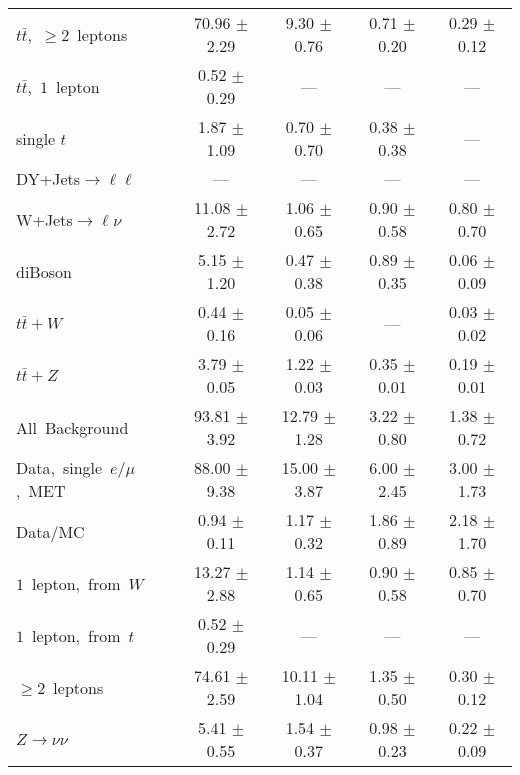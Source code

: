 \documentclass{article}
\begin{document}
\begin{longtable}{|l|c|c|c|c|}
$t\bar{t}$,~$\ge2$~leptons & 70.96 $\pm$ 2.29  & 9.30 $\pm$ 0.76  & 0.71 $\pm$ 0.20  & 0.29 $\pm$ 0.12 \\* 
$t\bar{t}$,~$1$~lepton & 0.52 $\pm$ 0.29  & ---  & ---  & --- \\* 
single $t$  & 1.87 $\pm$ 1.09  & 0.70 $\pm$ 0.70  & 0.38 $\pm$ 0.38  & --- \\* 
DY+Jets$\rightarrow\ell\ell$  & ---  & ---  & ---  & --- \\* 
W+Jets$\rightarrow\ell\nu$  & 11.08 $\pm$ 2.72  & 1.06 $\pm$ 0.65  & 0.90 $\pm$ 0.58  & 0.80 $\pm$ 0.70 \\* 
diBoson  & 5.15 $\pm$ 1.20  & 0.47 $\pm$ 0.38  & 0.89 $\pm$ 0.35  & 0.06 $\pm$ 0.09 \\* 
$t\bar{t}+W$  & 0.44 $\pm$ 0.16  & 0.05 $\pm$ 0.06  & ---  & 0.03 $\pm$ 0.02 \\* 
$t\bar{t}+Z$  & 3.79 $\pm$ 0.05  & 1.22 $\pm$ 0.03  & 0.35 $\pm$ 0.01  & 0.19 $\pm$ 0.01 \\* 
\hline \hline 
All~Background  & 93.81 $\pm$ 3.92  & 12.79 $\pm$ 1.28  & 3.22 $\pm$ 0.80  & 1.38 $\pm$ 0.72 \\* 
Data,~single~$e/\mu$,~MET  & 88.00 $\pm$ 9.38  & 15.00 $\pm$ 3.87  & 6.00 $\pm$ 2.45  & 3.00 $\pm$ 1.73 \\* 
Data/MC  & 0.94 $\pm$ 0.11  & 1.17 $\pm$ 0.32  & 1.86 $\pm$ 0.89  & 2.18 $\pm$ 1.70 \\* 
\hline \hline 
$1$~lepton,~from~$W$  & 13.27 $\pm$ 2.88  & 1.14 $\pm$ 0.65  & 0.90 $\pm$ 0.58  & 0.85 $\pm$ 0.70 \\* 
$1$~lepton,~from~$t$  & 0.52 $\pm$ 0.29  & ---  & ---  & --- \\* 
$\ge2$~leptons  & 74.61 $\pm$ 2.59  & 10.11 $\pm$ 1.04  & 1.35 $\pm$ 0.50  & 0.30 $\pm$ 0.12 \\* 
$Z\rightarrow\nu\nu$  & 5.41 $\pm$ 0.55  & 1.54 $\pm$ 0.37  & 0.98 $\pm$ 0.23  & 0.22 $\pm$ 0.09 \\* 
\hline 
\end{longtable} 

 
 
 
 
\pagebreak 

 
 
 
 
\end{document}
